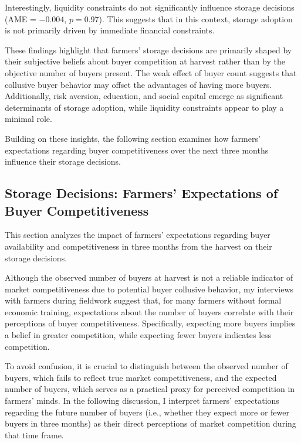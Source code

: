 Interestingly, liquidity constraints do not significantly influence storage decisions (AME = \(-0.004\), \(p=0.97\)). This suggests that in this context, storage adoption is not primarily driven by immediate financial constraints.

These findings highlight that farmers' storage decisions are primarily shaped by their subjective beliefs about buyer competition at harvest rather than by the objective number of buyers present. The weak effect of buyer count suggests that collusive buyer behavior may offset the advantages of having more buyers. Additionally, risk aversion, education, and social capital emerge as significant determinants of storage adoption, while liquidity constraints appear to play a minimal role.

Building on these insights, the following section examines how farmers' expectations regarding buyer competitiveness over the next three months influence their storage decisions.




\subsection{Storage Decisions: Farmers' Expectations of Buyer Competitiveness}

\noindent This section analyzes the impact of farmers' expectations regarding buyer availability and competitiveness in three months from the harvest on their storage decisions. 

Although the observed number of buyers at harvest is not a reliable indicator of market competitiveness due to potential buyer collusive behavior, my interviews with farmers during fieldwork suggest that, for many farmers without formal economic training, expectations about the number of buyers correlate with their perceptions of buyer competitiveness. Specifically, expecting more buyers implies a belief in greater competition, while expecting fewer buyers indicates less competition.

To avoid confusion, it is crucial to distinguish between the observed number of buyers, which fails to reflect true market competitiveness, and the expected number of buyers, which serves as a practical proxy for perceived competition in farmers' minds. In the following discussion, I interpret farmers' expectations regarding the future number of buyers (i.e., whether they expect more or fewer buyers in three months) as their direct perceptions of market competition during that time frame.


